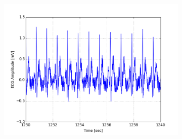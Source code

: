 \documentclass[paper=a4, fontsize=11pt]{scrartcl}
\numberwithin{equation}{section}		%
\numberwithin{figure}{section}			%
\numberwithin{table}{section}		    %
\begin{document}
\begin{appendices}
\begin{figure}[H]
\begin{subfigure}[b]{0.3\textwidth}
		\includegraphics[width=\textwidth]{sim/ecg_30}
	\end{subfigure}
\end{figure}


\end{appendices}
\end{document}
